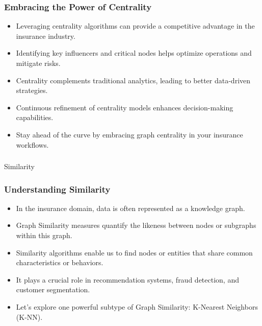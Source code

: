 \begin{frame}[fragile]\frametitle{Embracing the Power of Centrality}
\begin{itemize}
\item Leveraging centrality algorithms can provide a competitive advantage in the insurance industry.
\item Identifying key influencers and critical nodes helps optimize operations and mitigate risks.
\item Centrality complements traditional analytics, leading to better data-driven strategies.
\item Continuous refinement of centrality models enhances decision-making capabilities.
\item Stay ahead of the curve by embracing graph centrality in your insurance workflows.
\end{itemize}
\end{frame}

\begin{frame}[fragile]\frametitle{}
\begin{center}
{\Large Similarity}
\end{center}
\end{frame}

\begin{frame}[fragile]\frametitle{Understanding Similarity}
\begin{itemize}
\item In the insurance domain, data is often represented as a knowledge graph.
\item Graph Similarity measures quantify the likeness between nodes or subgraphs within this graph.
\item Similarity algorithms enable us to find nodes or entities that share common characteristics or behaviors.
\item It plays a crucial role in recommendation systems, fraud detection, and customer segmentation.
\item Let's explore one powerful subtype of Graph Similarity: K-Nearest Neighbors (K-NN).
\end{itemize}
\end{frame}

